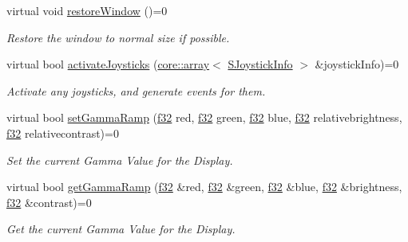\begin{DoxyCompactItemize}
\mbox{\label{classirr_1_1IrrlichtDevice_a4a92974b424cc612198505e31fe125d3}} 
virtual void \hyperlink{classirr_1_1IrrlichtDevice_a4a92974b424cc612198505e31fe125d3}{restore\+Window} ()=0
\begin{DoxyCompactList}\small\item\em Restore the window to normal size if possible. \end{DoxyCompactList}\item 
virtual bool \hyperlink{classirr_1_1IrrlichtDevice_af06f8d2c4fdffd1f879e46685bcbc6e3}{activate\+Joysticks} (\hyperlink{classirr_1_1core_1_1array}{core\+::array}$<$ \hyperlink{structirr_1_1SJoystickInfo}{S\+Joystick\+Info} $>$ \&joystick\+Info)=0
\begin{DoxyCompactList}\small\item\em Activate any joysticks, and generate events for them. \end{DoxyCompactList}\item 
\mbox{\label{classirr_1_1IrrlichtDevice_aaa6cec87ca0a18ec369ea12f7fbd490c}} 
virtual bool \hyperlink{classirr_1_1IrrlichtDevice_aaa6cec87ca0a18ec369ea12f7fbd490c}{set\+Gamma\+Ramp} (\hyperlink{namespaceirr_a0277be98d67dc26ff93b1a6a1d086b07}{f32} red, \hyperlink{namespaceirr_a0277be98d67dc26ff93b1a6a1d086b07}{f32} green, \hyperlink{namespaceirr_a0277be98d67dc26ff93b1a6a1d086b07}{f32} blue, \hyperlink{namespaceirr_a0277be98d67dc26ff93b1a6a1d086b07}{f32} relativebrightness, \hyperlink{namespaceirr_a0277be98d67dc26ff93b1a6a1d086b07}{f32} relativecontrast)=0
\begin{DoxyCompactList}\small\item\em Set the current Gamma Value for the Display. \end{DoxyCompactList}\item 
\mbox{\label{classirr_1_1IrrlichtDevice_a30c4e1716271600a88e0ca07ca030f9b}} 
virtual bool \hyperlink{classirr_1_1IrrlichtDevice_a30c4e1716271600a88e0ca07ca030f9b}{get\+Gamma\+Ramp} (\hyperlink{namespaceirr_a0277be98d67dc26ff93b1a6a1d086b07}{f32} \&red, \hyperlink{namespaceirr_a0277be98d67dc26ff93b1a6a1d086b07}{f32} \&green, \hyperlink{namespaceirr_a0277be98d67dc26ff93b1a6a1d086b07}{f32} \&blue, \hyperlink{namespaceirr_a0277be98d67dc26ff93b1a6a1d086b07}{f32} \&brightness, \hyperlink{namespaceirr_a0277be98d67dc26ff93b1a6a1d086b07}{f32} \&contrast)=0
\begin{DoxyCompactList}\small\item\em Get the current Gamma Value for the Display. \end{DoxyCompactList}\item 

\end{DoxyCompactItemize}
